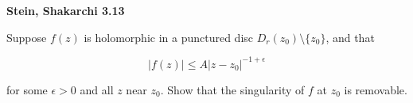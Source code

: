 \textbf{Stein, Shakarchi 3.13}

Suppose $f(z)$ is holomorphic in a punctured disc $D_r(z_0) \setminus \{z_0\}$, and that

$$
|f(z)| \le A|z - z_0|^{-1 + \epsilon}
$$

for some $\epsilon > 0$ and all $z$ near $z_0$. Show that the singularity of $f$ at $z_0$ is removable.

\begin{solution}
  \ \\
\end{solution}